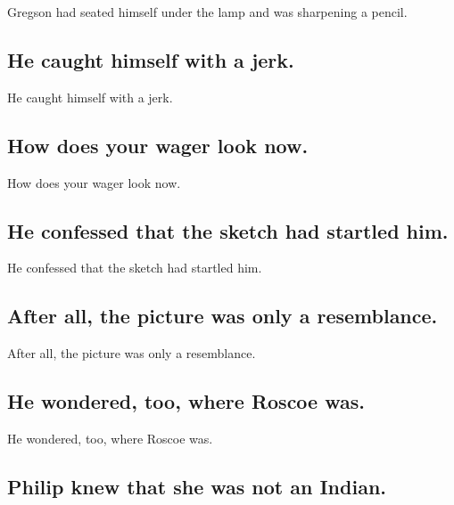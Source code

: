 \documentclass[]{article}
\begin{document}
Gregson had seated himself under the lamp and was sharpening a pencil.

\hypertarget{he-caught-himself-with-a-jerk.}{%
\subsection{He caught himself with a
jerk.}\label{he-caught-himself-with-a-jerk.}}

He caught himself with a jerk.

\hypertarget{how-does-your-wager-look-now.}{%
\subsection{How does your wager look
now.}\label{how-does-your-wager-look-now.}}

How does your wager look now.

\hypertarget{he-confessed-that-the-sketch-had-startled-him.}{%
\subsection{He confessed that the sketch had startled
him.}\label{he-confessed-that-the-sketch-had-startled-him.}}

He confessed that the sketch had startled him.

\hypertarget{after-all-the-picture-was-only-a-resemblance.}{%
\subsection{After all, the picture was only a
resemblance.}\label{after-all-the-picture-was-only-a-resemblance.}}

After all, the picture was only a resemblance.

\hypertarget{he-wondered-too-where-roscoe-was.}{%
\subsection{He wondered, too, where Roscoe
was.}\label{he-wondered-too-where-roscoe-was.}}

He wondered, too, where Roscoe was.

\hypertarget{philip-knew-that-she-was-not-an-indian.}{%
\subsection{Philip knew that she was not an
Indian.}\label{philip-knew-that-she-was-not-an-indian.}}
\end{document}
